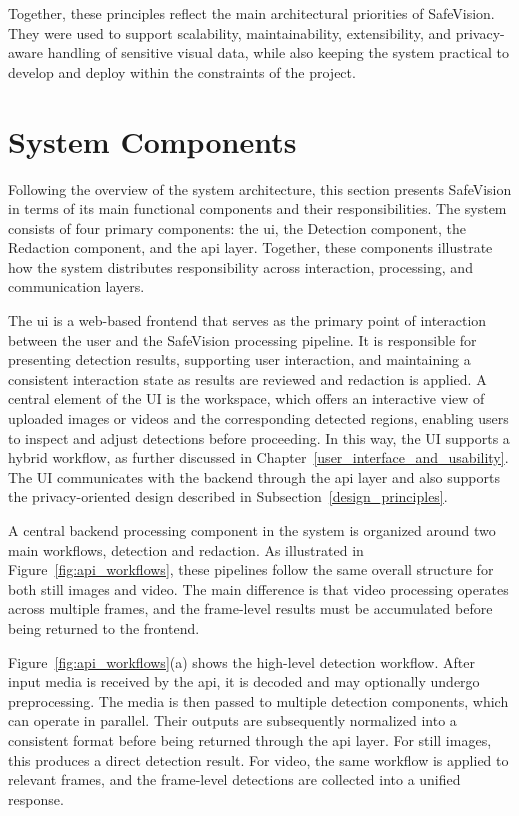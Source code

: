 Together, these principles reflect the main architectural priorities of \gls{SafeVision}. They were used to support scalability, maintainability, extensibility, and privacy-aware handling of sensitive visual data, while also keeping the system practical to develop and deploy within the constraints of the project.

\section{System Components}

Following the overview of the system architecture, this section presents \gls{SafeVision} in terms of its main functional components and their responsibilities. The system consists of four primary components: the \acrshort{ui}, the Detection component, the Redaction component, and the \acrshort{api} layer. Together, these components illustrate how the system distributes responsibility across interaction, processing, and communication layers.


The \acrshort{ui} is a web-based frontend that serves as the primary point of interaction between the user and the \gls{SafeVision} processing pipeline. It is responsible for presenting detection results, supporting user interaction, and maintaining a consistent interaction state as results are reviewed and redaction is applied. A central element of the UI is the workspace, which offers an interactive view of uploaded images or videos and the corresponding detected regions, enabling users to inspect and adjust detections before proceeding. In this way, the UI supports a hybrid workflow, as further discussed in Chapter~\ref{user_interface_and_usability}. The UI communicates with the backend through the \acrshort{api} layer and also supports the privacy-oriented design described in Subsection~\ref{design_principles}.


A central backend processing component in the system is organized around two main workflows, detection and redaction. As illustrated in Figure~\ref{fig:api_workflows}, these pipelines follow the same overall structure for both still images and video. The main difference is that video processing operates across multiple frames, and the frame-level results must be accumulated before being returned to the frontend.

Figure~\ref{fig:api_workflows}(a) shows the high-level detection workflow. After input media is received by the \acrshort{api}, it is decoded and may optionally undergo
preprocessing. The media is then passed to multiple detection components, which can operate in parallel. Their outputs are subsequently normalized into a consistent format before being returned through the \acrshort{api} layer. For still images, this produces a direct detection result. For video, the same workflow is applied to relevant frames, and the frame-level detections are collected into a unified response.

